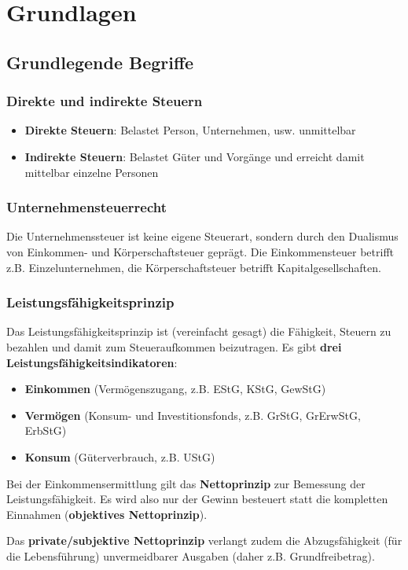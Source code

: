 \documentclass[12pt,A4]{extarticle}
\newcommand{\highlight}[1]{\textcolor{highlightColor}{\textbf{#1}}}
\begin{document}
\disclaimer

\tableofcontents
\clearpage

\section{Grundlagen}
\subsection{Grundlegende Begriffe}
\subsubsection{Direkte und indirekte Steuern}
\begin{itemize}
  \item{\textbf{Direkte Steuern}: Belastet Person, Unternehmen, usw. unmittelbar}
  \item{\textbf{Indirekte Steuern}: Belastet Güter und Vorgänge und erreicht damit mittelbar einzelne Personen}
\end{itemize}

\subsubsection{Unternehmensteuerrecht}
Die Unternehmenssteuer ist keine eigene Steuerart, sondern durch den Dualismus von Einkommen- und Körperschaftsteuer geprägt. Die Einkommensteuer betrifft z.B. Einzelunternehmen, die Körperschaftsteuer betrifft Kapitalgesellschaften.

\subsubsection{Leistungsfähigkeitsprinzip}
Das Leistungsfähigkeitsprinzip ist (vereinfacht gesagt) die Fähigkeit, Steuern zu bezahlen und damit zum Steueraufkommen beizutragen. Es gibt \textbf{drei Leistungsfähigkeitsindikatoren}:
\begin{itemize}
  \item{\textbf{Einkommen} (Vermögenszugang, z.B. EStG, KStG, GewStG)}
  \item{\textbf{Vermögen} (Konsum- und Investitionsfonds, z.B. GrStG, GrErwStG, ErbStG)}
  \item{\textbf{Konsum} (Güterverbrauch, z.B. UStG)}
\end{itemize}
Bei der Einkommensermittlung gilt das \textbf{Nettoprinzip} zur Bemessung der Leistungsfähigkeit. Es wird also nur der Gewinn besteuert statt die kompletten Einnahmen (\highlight{objektives Nettoprinzip}).\par
Das \highlight{private/subjektive Nettoprinzip} verlangt zudem die Abzugsfähigkeit (für die Lebensführung) unvermeidbarer Ausgaben (daher z.B. Grundfreibetrag).
\end{document}

